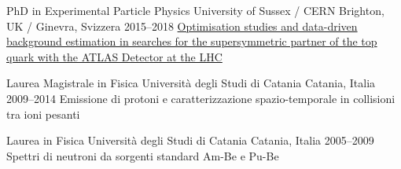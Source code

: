 






\begin{cventries}

  \cventry
      {PhD in Experimental Particle Physics}
      {University of Sussex / CERN}
      {Brighton, UK / Ginevra, Svizzera}
      {2015--2018}
      {
      \href{http://cds.cern.ch/record/2650559?ln=en}
      {Optimisation studies and data-driven background estimation in searches for the 
      supersymmetric partner of the top quark with the ATLAS Detector at the LHC}
      }

  \cventry
      {Laurea Magistrale in Fisica}
      {Università degli Studi di Catania}
      {Catania, Italia}
      {2009--2014}
      {Emissione di protoni e caratterizzazione spazio-temporale in collisioni tra ioni pesanti}
      
  \cventry
      {Laurea in Fisica}
      {Università degli Studi di Catania}
      {Catania, Italia}
      {2005--2009}
      {Spettri di neutroni da sorgenti standard Am-Be e Pu-Be}
\end{cventries}